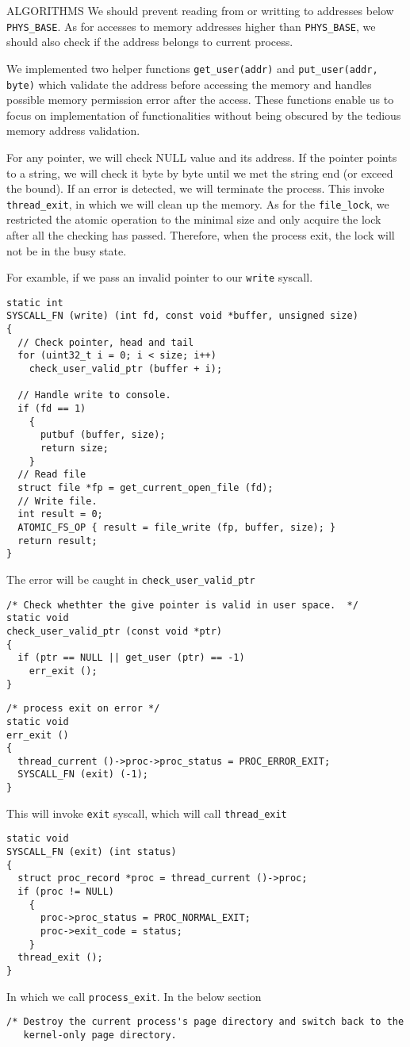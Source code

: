 \begin{aspect}{ALGORITHMS}
We should prevent reading from or writting to addresses below \lstinline{PHYS_BASE}.
As for accesses to memory addresses higher than \lstinline{PHYS_BASE}, we should also check if the address belongs to current process.

We implemented two helper functions \lstinline{get_user(addr)} and \lstinline{put_user(addr, byte)}
which validate the address before accessing the memory and handles possible memory permission error after the access.
These functions enable us to focus on implementation of functionalities without being obscured by the tedious memory address validation.

For any pointer, we will check NULL value and its address. If the pointer points to a string, we will check it byte by byte until we met the string end (or exceed the bound). If an error is detected, we will terminate the process. This invoke \lstinline{thread_exit}, in which we will clean up the memory. As for the \lstinline{file_lock}, we restricted the atomic operation to the minimal size and only acquire the lock after all the checking has passed. Therefore, when the process exit, the lock will not be in the busy state.

For examble, if we pass an invalid pointer to our \lstinline{write} syscall.
\begin{lstlisting}
static int
SYSCALL_FN (write) (int fd, const void *buffer, unsigned size)
{
  // Check pointer, head and tail
  for (uint32_t i = 0; i < size; i++)
    check_user_valid_ptr (buffer + i);

  // Handle write to console.
  if (fd == 1)
    {
      putbuf (buffer, size);
      return size;
    }
  // Read file
  struct file *fp = get_current_open_file (fd);
  // Write file.
  int result = 0;
  ATOMIC_FS_OP { result = file_write (fp, buffer, size); }
  return result;
}
\end{lstlisting}
The error will be caught in \lstinline{check_user_valid_ptr}
\begin{lstlisting}
/* Check whethter the give pointer is valid in user space.  */
static void
check_user_valid_ptr (const void *ptr)
{
  if (ptr == NULL || get_user (ptr) == -1)
    err_exit ();
}
\end{lstlisting}
\begin{lstlisting}
/* process exit on error */
static void
err_exit ()
{
  thread_current ()->proc->proc_status = PROC_ERROR_EXIT;
  SYSCALL_FN (exit) (-1);
}
\end{lstlisting}
This will invoke \lstinline{exit} syscall, which will call \lstinline{thread_exit}
\begin{lstlisting}
static void
SYSCALL_FN (exit) (int status)
{
  struct proc_record *proc = thread_current ()->proc;
  if (proc != NULL)
    {
      proc->proc_status = PROC_NORMAL_EXIT;
      proc->exit_code = status;
    }
  thread_exit ();
}
\end{lstlisting}
In which we call \lstinline{process_exit}. In the below section
\begin{lstlisting}
/* Destroy the current process's page directory and switch back to the
   kernel-only page directory.


\end{lstlisting}
\end{aspect}
